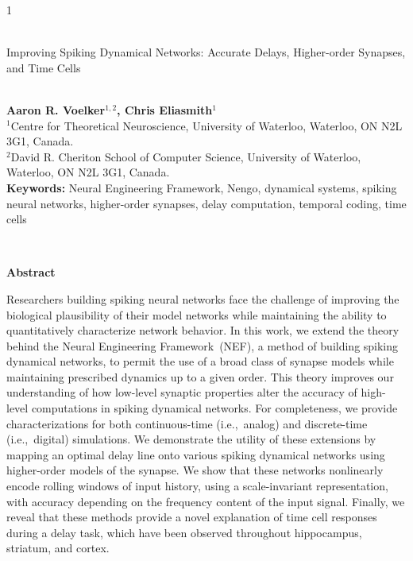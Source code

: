 \documentclass[12pt]{article}
\theoremstyle{definition}
\begin{document}
\hspace{13.9cm}1

\ \vspace{20mm}\\

{\LARGE Improving Spiking Dynamical Networks: Accurate Delays, Higher-order Synapses, and Time Cells}

\ \\
{\bf \large Aaron R. Voelker$^{\displaystyle 1, \displaystyle 2}$, Chris Eliasmith$^{\displaystyle 1}$}\\
{$^{\displaystyle 1}$Centre for Theoretical Neuroscience, University of Waterloo, Waterloo, ON N2L 3G1, Canada.}\\
{$^{\displaystyle 2}$David R. Cheriton School of Computer Science, University of Waterloo, Waterloo, ON N2L 3G1, Canada.}\\
%

{\bf Keywords:} Neural Engineering Framework, Nengo, dynamical systems, spiking neural networks, higher-order synapses, delay computation, temporal coding, time cells

\thispagestyle{empty}
%
\ \vspace{-0mm}\\
%

\newpage
\begin{center} {\bf Abstract} \end{center}
Researchers building spiking neural networks face the challenge of improving the biological plausibility of their model networks while maintaining the ability to quantitatively characterize network behavior.
In this work, we extend the theory behind the Neural Engineering Framework~(NEF), a method of building spiking dynamical networks, to permit the use of a broad class of synapse models while maintaining prescribed dynamics up to a given order.
This theory improves our understanding of how low-level synaptic properties alter the accuracy of high-level computations in spiking dynamical networks.
For completeness, we provide characterizations for both continuous-time (i.e.,~analog) and discrete-time (i.e.,~digital) simulations.
We demonstrate the utility of these extensions by mapping an optimal delay line onto various spiking dynamical networks using higher-order models of the synapse.
We show that these networks nonlinearly encode rolling windows of input history, using a scale-invariant representation, with accuracy depending on the frequency content of the input signal.
Finally, we reveal that these methods provide a novel explanation of time cell responses during a delay task, which have been observed throughout hippocampus, striatum, and cortex.
\newpage
\end{document}
